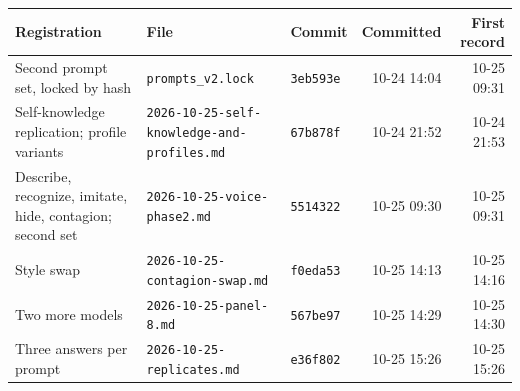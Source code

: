 \begin{tabular}{lllrr}
\toprule
Registration & File & Commit & Committed & First record \\
\midrule
Second prompt set, locked by hash & \texttt{prompts\_v2.lock} & \texttt{3eb593e} & 10-24 14:04 & 10-25 09:31 \\
Self-knowledge replication; profile variants & \texttt{2026-10-25-self-knowledge-and-profiles.md} & \texttt{67b878f} & 10-24 21:52 & 10-24 21:53 \\
Describe, recognize, imitate, hide, contagion; second set & \texttt{2026-10-25-voice-phase2.md} & \texttt{5514322} & 10-25 09:30 & 10-25 09:31 \\
Style swap & \texttt{2026-10-25-contagion-swap.md} & \texttt{f0eda53} & 10-25 14:13 & 10-25 14:16 \\
Two more models & \texttt{2026-10-25-panel-8.md} & \texttt{567be97} & 10-25 14:29 & 10-25 14:30 \\
Three answers per prompt & \texttt{2026-10-25-replicates.md} & \texttt{e36f802} & 10-25 15:26 & 10-25 15:26 \\
\bottomrule
\end{tabular}
